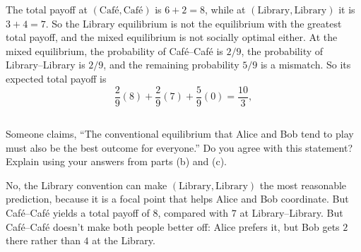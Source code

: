 \documentclass[newpages]{assignment}
\begin{document}
\begin{solution}
    The total payoff at \((\text{Café},\text{Café})\) is \(6+2=8\), while
    at \((\text{Library},\text{Library})\) it is \(3+4=7\). So the Library equilibrium is
    not the equilibrium with the greatest total payoff, and the mixed
    equilibrium is not socially optimal either. At the mixed equilibrium,
    the probability of Café--Café is \(2/9\), the probability of
    Library--Library is \(2/9\), and the remaining probability \(5/9\)
    is a mismatch. So its expected total payoff is
    \[
        \frac29(8)+\frac29(7)+\frac59(0)=\frac{10}{3},
    \]
\end{solution}

\subsection{}
\begin{problem}
    Someone claims, “The conventional equilibrium that Alice and Bob tend to play must also be the best outcome for everyone.” Do you agree with this statement? Explain using your answers from parts (b) and (c).
\end{problem}

\begin{solution}
    No, the Library convention can make
    \((\text{Library},\text{Library})\) the most reasonable prediction, because
    it is a focal point that helps Alice and Bob coordinate. But
    Café--Café yields a total payoff of \(8\), compared with \(7\) at
    Library--Library. But Café--Café doesn't make both people better off:
    Alice prefers it, but Bob gets \(2\) there rather than \(4\) at the
    Library.
\end{solution}
\end{document}
